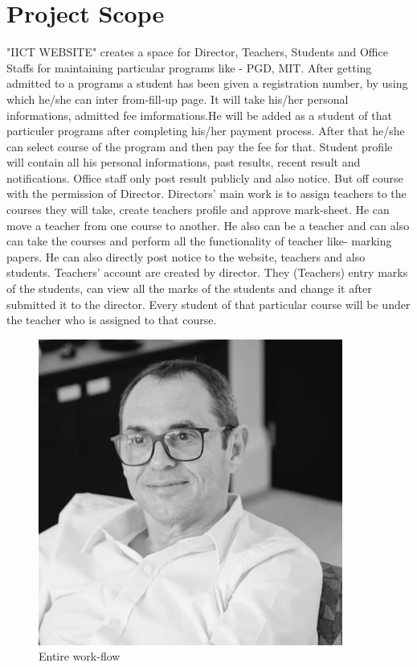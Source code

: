 \documentclass{scrreprt}
\begin{document}
\section{Project Scope}
"IICT WEBSITE" creates a space for Director, Teachers, Students and Office Staffs for maintaining particular programs like - PGD, MIT. 
\newline
After getting admitted to a programs a student has been given a registration number, by using which he/she can inter from-fill-up page. It will take his/her personal informations, admitted fee imformations.He will be added as a student of that particuler programs after completing his/her payment process. After that he/she can select course of the program and then pay the fee for that. Student profile will contain all his personal informations, past results, recent result and notifications.
\newline
Office staff only post result publicly and also notice. But off course with the permission of Director.  
\newline
Directors' main work is to assign teachers to the courses they will take, create teachers profile and approve mark-sheet. He can move a teacher from one course to another. He also can be a teacher and can also can take the courses and perform all the functionality of teacher like- marking papers. He can also directly post notice to the website, teachers and also students.
\newline
Teachers' account are created by director. They (Teachers) entry marks of the students, can view all the marks of the students and change it after submitted it to the director. Every student of that particular course will be under the teacher who is assigned to that course. 
\newline
\begin{figure}
    \centering
    \includegraphics[width=10cm]{ricardo.jpg}
    \caption{Entire work-flow}
    \label{fig:IICT WEBSITE}
\end{figure}
\end{document}
